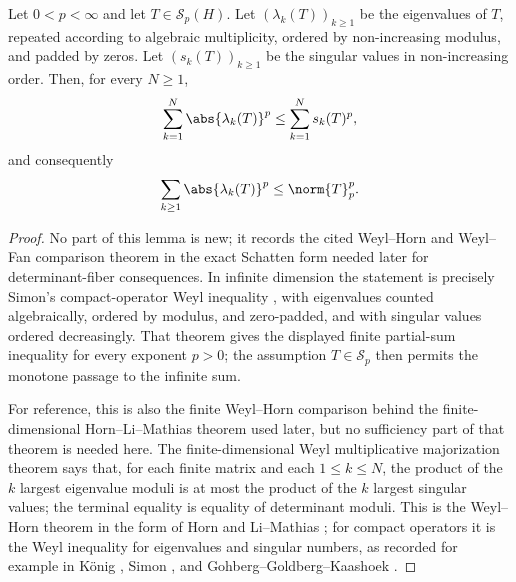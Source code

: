 \begin{lemma}
  \label{lem:weyl-fan-schatten-p-sum}
Let \(0<p<\infty\) and let \(T\in\mathcal S_p(H)\). Let
\((\lambda_k(T))_{k\ge1}\) be the eigenvalues of \(T\), repeated according
to algebraic multiplicity, ordered by non-increasing modulus, and padded by
zeros. Let \((s_k(T))_{k\ge1}\) be the singular values in non-increasing
order. Then, for every \(N\ge1\),
\[
  \sum_{k=1}^N\abs{\lambda_k(T)}^p
  \le
  \sum_{k=1}^N s_k(T)^p,
\]
and consequently
\[
  \sum_{k\ge1}\abs{\lambda_k(T)}^p\le \norm{T}_p^p .
\]
\end{lemma}

\begin{proof}
  No part of this lemma is new; it records the cited Weyl--Horn and
  Weyl--Fan comparison theorem in the exact Schatten form needed later for
  determinant-fiber consequences.  In infinite dimension the statement is
  precisely Simon's compact-operator Weyl inequality
  \cite[Chapter~1, Theorem~1.15]{Simon2005TraceIdeals}, with eigenvalues
  counted algebraically, ordered by modulus, and zero-padded, and with singular
  values ordered decreasingly.  That theorem gives the displayed finite
  partial-sum inequality for every exponent \(p>0\); the assumption
  \(T\in\mathcal S_p\) then permits the monotone passage to the infinite sum.

  For reference, this is also the finite Weyl--Horn comparison behind the
  finite-dimensional Horn--Li--Mathias theorem used later, but no sufficiency
  part of that theorem is needed here.
  The finite-dimensional Weyl multiplicative majorization theorem says that,
  for each finite matrix and each \(1\le k\le N\), the product of the \(k\)
  largest eigenvalue moduli is at most the product of the \(k\) largest
  singular values; the terminal equality is equality of determinant moduli.
  This is the Weyl--Horn theorem in the form of Horn
  \cite[Theorem~1]{Horn1954DoublyStochastic} and Li--Mathias
  \cite[Theorem~1.1, p.~115]{LiMathias2001Construction}; for compact
  operators it is the Weyl inequality for eigenvalues and singular numbers,
  as recorded for example in K\"onig
  \cite[Chapter~2, Section~2.a]{Konig1986EigenvalueDistribution}, Simon
  \cite[Chapter~1, Theorem~1.15]{Simon2005TraceIdeals}, and
  Gohberg--Goldberg--Kaashoek
  \cite[Chapter~VI, Section~1]{GohbergGoldbergKaashoek1990ClassesI}.


\end{proof}
